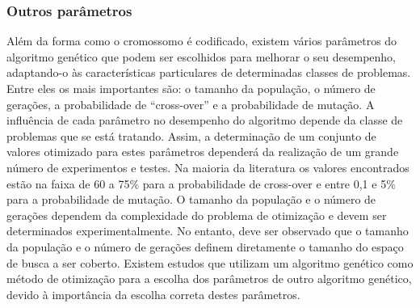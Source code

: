\subsubsection{Outros parâmetros}

Além da forma como o cromossomo é codificado, existem vários parâmetros do algoritmo genético que podem ser escolhidos para melhorar o seu desempenho, adaptando-o às características  particulares de determinadas classes de problemas.  Entre eles os mais importantes são: o tamanho da população, o número de gerações, a probabilidade de ``cross-over''  e a probabilidade de mutação. 
A influência de cada parâmetro no desempenho do algoritmo depende da classe de problemas que se está tratando. Assim, a determinação de um conjunto de valores otimizado para estes parâmetros dependerá da realização de um grande número de experimentos e testes. Na maioria da literatura os valores encontrados estão na faixa de 60 a 75\% para a probabilidade de cross-over e entre 0,1 e 5\% para a probabilidade de mutação. O tamanho da população e o número de gerações dependem da complexidade do problema de otimização e devem ser determinados experimentalmente. No entanto, deve ser observado que o tamanho da população e o número de gerações definem diretamente o tamanho do espaço de busca a ser coberto. Existem estudos que utilizam um algoritmo genético  como método de otimização para a escolha dos parâmetros de outro algoritmo genético, devido à importância da escolha correta destes parâmetros.

